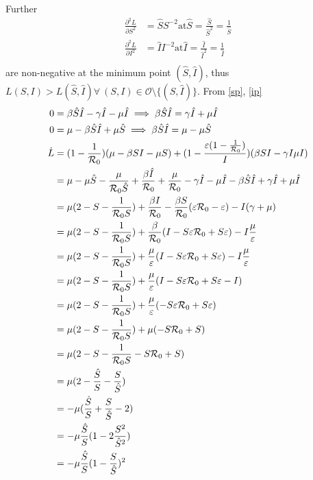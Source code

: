 Further
\begin{align}
    \frac{\partial^2 L}{\partial S^2} &= \hat{S}S^{-2} \textrm{at} \hat{S} = \frac{\hat{S}}{\hat{S}^2} = \frac{1}{\hat{S}}\nonumber\\
    \frac{\partial^2 L}{\partial I^2} &= \hat{I}I^{-2} \textrm{at} \hat{I} = \frac{\hat{I}}{\hat{I}^2} = \frac{1}{\hat{I}}\nonumber\\
\end{align}
are non-negative at the minimum point $(\hat{S},\hat{I})$, thus $L(S,I) > L(\hat{S},\hat{I}) \forall\ (S,I) \in {\mathcal O} \setminus \{(\hat{S},\hat{I})\}$.
From \ref{sp}, \ref{ip}
\begin{align}
    0 &= \beta \hat{S} \hat{I} - \gamma \hat{I} - \mu \hat{I} \implies \beta \hat{S} \hat{I} = \gamma \hat{I} + \mu \hat{I}\nonumber\\
    0 &= \mu - \beta \hat{S} \hat{I} + \mu \hat{S} \implies \beta \hat{S} \hat{I} = \mu - \mu \hat{S}\nonumber\\
    \dot{L} &= (1-\frac{1}{{\mathcal R_0}})(\mu - \beta SI - \mu S) + (1 - \frac{\varepsilon(1 - \frac{1}{{\mathcal R_0}})}{I})(\beta SI - \gamma I \mu I)\nonumber\\
            &= \mu - \mu \hat{S} - \frac{\mu}{{\mathcal R_0}\hat{S}} + \frac{\beta \hat{I}}{{\mathcal R_0}} + \frac{\mu}{{\mathcal R_0}} - \gamma \hat{I} - \mu \hat{I} - \beta \hat{S} \hat{I} + \gamma \hat{I} + \mu \hat{I}\nonumber\\
            &= \mu(2 - S - \frac{1}{{\mathcal R_0} S}) + \frac{\beta I}{{\mathcal R_0}} - \frac{\beta S}{\mathcal R_0}(\varepsilon{\mathcal R_0}-\varepsilon) - I(\gamma+\mu)\nonumber\\
            &= \mu(2 - S - \frac{1}{{\mathcal R_0} S}) + \frac{\beta}{{\mathcal R_0}}(I - S\varepsilon {\mathcal R_0} + S \varepsilon) - I \frac{\mu}{\varepsilon}\nonumber\\
            &= \mu(2 - S - \frac{1}{{\mathcal R_0} S}) + \frac{\mu}{\varepsilon}(I - S\varepsilon {\mathcal R_0} + S \varepsilon) - I \frac{\mu}{\varepsilon}\nonumber\\
            &= \mu(2 - S - \frac{1}{{\mathcal R_0} S}) + \frac{\mu}{\varepsilon}(I - S\varepsilon {\mathcal R_0} + S \varepsilon -I) \nonumber\\
            &= \mu(2 - S - \frac{1}{{\mathcal R_0} S}) + \frac{\mu}{\varepsilon}(-S\varepsilon {\mathcal R_0} + S \varepsilon) \nonumber\\
            &= \mu(2 - S - \frac{1}{{\mathcal R_0} S}) + \mu(-S {\mathcal R_0} + S) \nonumber\\
            &= \mu(2 - S - \frac{1}{{\mathcal R_0} S} -S {\mathcal R_0} + S) \nonumber\\
            &= \mu(2 - \frac{\hat{S}}{S} - \frac{S}{\hat{S}})\nonumber\\
            &= -\mu( \frac{\hat{S}}{S} + \frac{S}{\hat{S}}-2)\nonumber\\
            &= -\mu\frac{\hat{S}}{S}(1- 2\frac{S^2}{\hat{S}^2})\nonumber\\
            &= -\mu\frac{\hat{S}}{S}(1- \frac{S}{\hat{S}})^2\label{fin}
\end{align}

